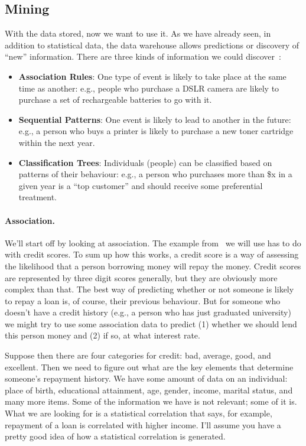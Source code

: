 \subsection*{Mining}

With the data stored, now we want to use it. As we have already seen, in addition to statistical data, the data warehouse allows predictions or discovery of ``new'' information. There are three kinds of information we could discover~\cite{fds}:

\begin{itemize}
	\item \textbf{Association Rules}: One type of event is likely to take place at the same time as another: e.g., people who purchase a DSLR camera are likely to purchase a set of rechargeable batteries to go with it.
	\item \textbf{Sequential Patterns}: One event is likely to lead to another in the future: e.g., a person who buys a printer is likely to purchase a new toner cartridge within the next year.
	\item \textbf{Classification Trees}: Individuals (people) can be classified based on patterns of their behaviour: e.g., a person who purchases more than \$x in a given year is a ``top customer'' and should receive some preferential treatment.
\end{itemize}

\paragraph{Association.} We'll start off by looking at association. The example from~\cite{dsc} we will use has to do with credit scores. To sum up how this works, a credit score is a way of assessing the likelihood that a person borrowing money will repay the money. Credit scores are represented by three digit scores generally, but they are obviously more complex than that. The best way of predicting whether or not someone is likely to repay a loan is, of course, their previous behaviour. But for someone who doesn't have a credit history (e.g., a person who has just graduated university) we might try to use some association data to predict (1) whether we should lend this person money and (2) if so, at what interest rate.

Suppose then there are four categories for credit: bad, average, good, and excellent. Then we need to figure out what are the key elements that determine someone's repayment history. We have some amount of data on an individual: place of birth, educational attainment, age, gender, income, marital status, and many more items. Some of the information we have is  not relevant; some of it is. What we are looking for is a statistical correlation that says, for example, repayment of a loan is correlated with higher income. I'll assume you have a pretty good idea of how a statistical correlation is generated.

